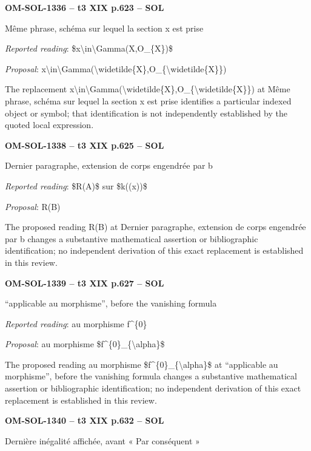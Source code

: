 \par\noindent\textbf{OM-SOL-1336 -- t3 XIX p.623 -- SOL}\par
Même phrase, schéma sur lequel la section x est prise\par
\emph{Reported reading}: \$x\textbackslash{}in\textbackslash{}Gamma(X,O\_\{X\})\$\par
\emph{Proposal}: x\textbackslash{}in\textbackslash{}Gamma(\textbackslash{}widetilde\{X\},O\_\{\textbackslash{}widetilde\{X\}\})\par
The replacement x\textbackslash{}in\textbackslash{}Gamma(\textbackslash{}widetilde\{X\},O\_\{\textbackslash{}widetilde\{X\}\}) at Même phrase, schéma sur lequel la section x est prise identifies a particular indexed object or symbol; that identification is not independently established by the quoted local expression.\par
\par\noindent\textbf{OM-SOL-1338 -- t3 XIX p.625 -- SOL}\par
Dernier paragraphe, extension de corps engendrée par b\par
\emph{Reported reading}: \$R(A)\$ sur \$k((x))\$\par
\emph{Proposal}: R(B)\par
The proposed reading R(B) at Dernier paragraphe, extension de corps engendrée par b changes a substantive mathematical assertion or bibliographic identification; no independent derivation of this exact replacement is established in this review.\par
\par\noindent\textbf{OM-SOL-1339 -- t3 XIX p.627 -- SOL}\par
“applicable au morphisme”, before the vanishing formula\par
\emph{Reported reading}: au morphisme f\textasciicircum{}\{0\}\par
\emph{Proposal}: au morphisme \$f\textasciicircum{}\{0\}\_\{\textbackslash{}alpha\}\$\par
The proposed reading au morphisme \$f\textasciicircum{}\{0\}\_\{\textbackslash{}alpha\}\$ at “applicable au morphisme”, before the vanishing formula changes a substantive mathematical assertion or bibliographic identification; no independent derivation of this exact replacement is established in this review.\par
\par\noindent\textbf{OM-SOL-1340 -- t3 XIX p.632 -- SOL}\par
Dernière inégalité affichée, avant « Par conséquent »\par
